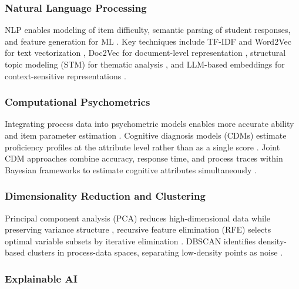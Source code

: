 \documentclass{ieeeaccess}
\begin{document}
\subsubsection{Natural Language Processing}

NLP enables modeling of item difficulty, semantic parsing of student responses, and feature generation for ML \cite{peters-etal2025, yun-etal2025}. Key techniques include TF-IDF and Word2Vec for text vectorization \cite{papadimas-etal2025, zhou-etal2024}, Doc2Vec for document-level representation \cite{yun-etal2025}, structural topic modeling (STM) for thematic analysis \cite{anghel-etal2024}, and LLM-based embeddings for context-sensitive representations \cite{peters-etal2025, wang-etal2019}.

\subsubsection{Computational Psychometrics}

Integrating process data into psychometric models enables more accurate ability and item parameter estimation \cite{costa-etal2021}. Cognitive diagnosis models (CDMs) estimate proficiency profiles at the attribute level rather than as a single score \cite{jiao-etal2021, liang-etal2023, zhan-qiao2022}. Joint CDM approaches combine accuracy, response time, and process traces within Bayesian frameworks to estimate cognitive attributes simultaneously \cite{liang-etal2023, huang-etal2021}.

\subsubsection{Dimensionality Reduction and Clustering}

Principal component analysis (PCA) reduces high-dimensional data while preserving variance structure \cite{shin-etal2024}, recursive feature elimination (RFE) selects optimal variable subsets by iterative elimination \cite{zhai-etal2024}. DBSCAN identifies density-based clusters in process-data spaces, separating low-density points as noise \cite{salles-etal2020}.

\subsubsection{Explainable AI}
\end{document}
